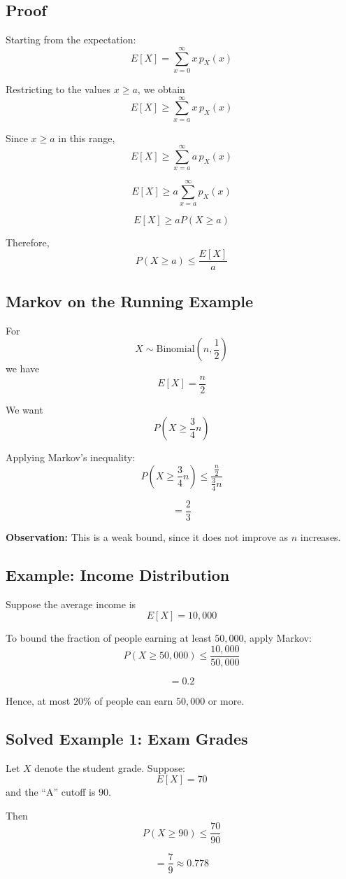 \documentclass[12pt]{article}
\begin{document}
\subsection{Proof}
Starting from the expectation:
\[
E[X]=\sum_{x=0}^{\infty} x\,p_X(x)
\]

Restricting to the values \(x \ge a\), we obtain
\[
E[X]\ge \sum_{x=a}^{\infty} x\,p_X(x)
\]

Since \(x \ge a\) in this range,
\[
E[X]\ge \sum_{x=a}^{\infty} a\,p_X(x)
\]

\[
E[X]\ge a\sum_{x=a}^{\infty} p_X(x)
\]

\[
E[X]\ge aP(X \ge a)
\]

Therefore,
\[
P(X \ge a)\le \frac{E[X]}{a}
\]

\subsection{Markov on the Running Example}
For
\[
X \sim \text{Binomial}\left(n,\frac12\right)
\]
we have
\[
E[X]=\frac{n}{2}
\]

We want
\[
P\left(X \ge \frac34 n\right)
\]

Applying Markov’s inequality:
\[
P\left(X \ge \frac34 n\right)\le \frac{\frac n2}{\frac34 n}
\]

\[
=\frac23
\]

\textbf{Observation:} This is a weak bound, since it does not improve as \(n\) increases.

\subsection{Example: Income Distribution}
Suppose the average income is
\[
E[X]=10{,}000
\]

To bound the fraction of people earning at least \(50{,}000\), apply Markov:
\[
P(X \ge 50{,}000)\le \frac{10{,}000}{50{,}000}
\]

\[
=0.2
\]

Hence, at most \(20\%\) of people can earn \(50{,}000\) or more.

\subsection{Solved Example 1: Exam Grades}
Let \(X\) denote the student grade. Suppose:
\[
E[X]=70
\]
and the ``A'' cutoff is \(90\).

Then
\[
P(X \ge 90)\le \frac{70}{90}
\]

\[
=\frac79\approx 0.778
\]
\end{document}
